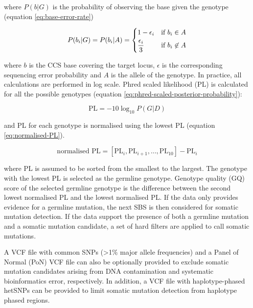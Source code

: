 where $P(b|G)$ is the probability of observing the base given the genotype (equation \ref{eq:base-error-rate})

\begin{equation} \label{eq:base-error-rate}
P(b_{i}|G) = P(b_{i}|A) = 
	\begin{dcases}
    	1 - \epsilon_{i} & \text{if } b_{i} \in A \\
	    \frac{\epsilon_{i}}{3} & \text{if } b_{i} \not\in A \\
	\end{dcases} \smallskip
\end{equation}

where $b$ is the CCS base covering the target locus, $\epsilon$ is the corresponding sequencing error probability and $A$ is the allele of the genotype. In practice, all calculations are performed in log scale. Phred scaled likelihood (PL) is calculated for all the possible genotypes (equation \ref{eq:phred-scaled-posterior-probability}):

\begin{equation} \label{eq:phred-scaled-posterior-probability}
\text{PL} = -10\log_{10}P(G|D) 
\end{equation}

and PL for each genotype is normalised using the lowest PL (equation \ref{eq:normalised-PL}).

\begin{equation} \label{eq:normalised-PL}
\text{normalised PL} = [\text{PL}_{i}, \text{PL}_{i+1}, \ldots, \text{PL}_{10}] - \text{PL}_{i}
\end{equation}

where PL is assumed to be sorted from the smallest to the largest. The genotype with the lowest PL is selected as the germline genotype. Genotype quality (GQ) score of the selected germline genotype is the difference between the second lowest normalised PL and the lowest normalised PL. If the data only provides evidence for a germline mutation, the next SBS is then considered for somatic mutation detection. If the data support the presence of both a germline mutation and a somatic mutation candidate, a set of hard filters are applied to call somatic mutations. 

A VCF file with common SNPs (>1\% major allele frequencies) and a Panel of Normal (PoN) VCF file can also be optionally provided to exclude somatic mutation candidates arising from DNA contamination and systematic bioinformatics error, respectively. In addition, a VCF file with haplotype-phased hetSNPs can be provided to limit somatic mutation detection from haplotype phased regions. 

